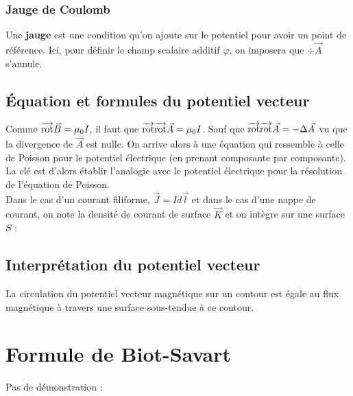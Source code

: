 \documentclass[12pt]{book}
\begin{document}

\subsubsection{Jauge de Coulomb}
Une \textbf{jauge} est une condition qu'on ajoute sur le potentiel pour avoir un point de référence. Ici, pour définir le champ scalaire additif $\varphi$, on imposera que $\div \vec{A}$ s'annule.

\subsection{Équation et formules du potentiel vecteur}
Comme $\overrightarrow{\text{rot}} \vec{B} = \mu_0 I$, il faut que $\overrightarrow{\text{rot}} \overrightarrow{\text{rot}} \vec{A} = \mu_0 I$. Sauf que $\overrightarrow{\text{rot}} \overrightarrow{\text{rot}} \vec{A} = -\Delta \vec{A}$ vu que la divergence de $\vec{A}$ est nulle. On arrive alors à une équation qui ressemble à celle de Poisson pour le potentiel électrique (en prenant composante par composante). La clé est d'alors établir l'analogie avec le potentiel électrique pour la résolution de l'équation de Poisson. \\

Dans le cas d'un courant filiforme, $\vec{J} = I d\vec{l}$ et dans le cas d'une nappe de courant, on note la densité de courant de surface $\vec{K}$ et on intègre sur une surface $S$ :

\subsection{Interprétation du potentiel vecteur}
La circulation du potentiel vecteur magnétique sur un contour est égale au flux magnétique à travers une surface sous-tendue à ce contour.
\section{Formule de Biot-Savart}
Pas de démonstration :
\end{document}

